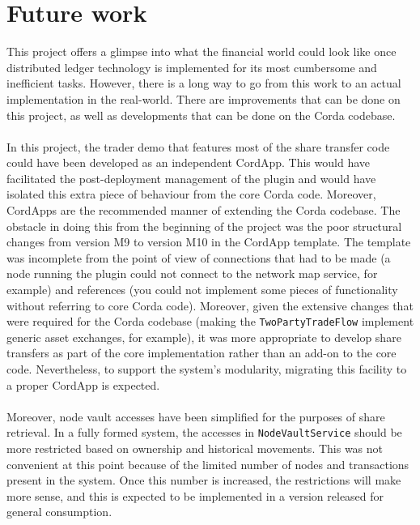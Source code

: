 \documentclass[12pt,twoside]{article}
\begin{document}
\section{Future work}
\label{sec:Future}
This project offers a glimpse into what the financial world could look like once distributed ledger technology is implemented for its most cumbersome and inefficient tasks. However, there is a long way to go from this work to an actual implementation in the real-world. There are improvements that can be done on this project, as well as developments that can be done on the Corda codebase. 
\\ \\
In this project, the trader demo that features most of the share transfer code could have been developed as an independent CordApp. This would have facilitated the post-deployment management of the plugin and would have isolated this extra piece of behaviour from the core Corda code. Moreover, CordApps are the recommended manner of extending the Corda codebase. The obstacle in doing this from the beginning of the project was the poor structural changes from version M9 to version M10 in the CordApp template. The template was incomplete from the point of view of connections that had to be made (a node running the plugin could not connect to the network map service, for example) and references (you could not implement some pieces of functionality without referring to core Corda code). Moreover, given the extensive changes that were required for the Corda codebase (making the \verb|TwoPartyTradeFlow| implement generic asset exchanges, for example), it was more appropriate to develop share transfers as part of the core implementation rather than an add-on to the core code. Nevertheless, to support the system's modularity, migrating this facility to a proper CordApp is expected.
\\ \\
Moreover, node vault accesses have been simplified for the purposes of share retrieval. In a fully formed system, the accesses in \verb|NodeVaultService| should be more restricted based on ownership and historical movements. This was not convenient at this point because of the limited number of nodes and transactions present in the system. Once this number is increased, the restrictions will make more sense, and this is expected to be implemented in a version released for general consumption.
\\ \\
\end{document}
